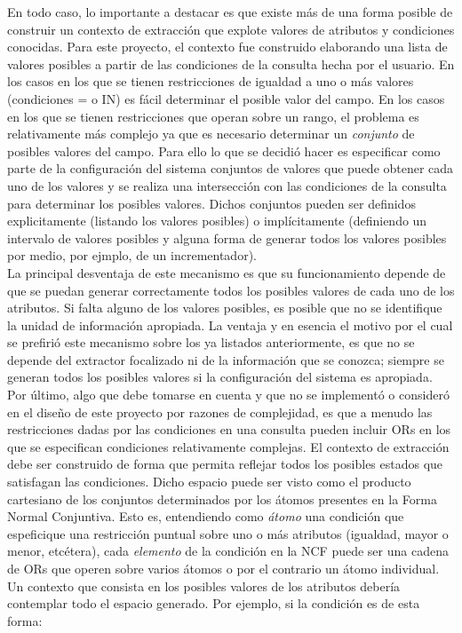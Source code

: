 En todo caso, lo importante a destacar es que existe más de una forma posible de construir un contexto de extracción que explote valores de atributos y condiciones conocidas. Para este proyecto, el contexto fue construido elaborando una lista de valores posibles a partir de las condiciones de la consulta hecha por el usuario. En los casos en los que se tienen restricciones de igualdad a uno o más valores (condiciones = o IN) es fácil determinar el posible valor del campo. En los casos en los que se tienen restricciones que operan sobre un rango, el problema es relativamente más complejo ya que es necesario determinar un \emph{conjunto} de posibles valores del campo. Para ello lo que se decidió hacer es especificar como parte de la configuración del sistema conjuntos de valores que puede obtener cada uno de los valores y se realiza una intersección con las condiciones de la consulta para determinar los posibles valores. Dichos conjuntos pueden ser definidos explicitamente (listando los valores posibles) o implícitamente (definiendo un intervalo de valores posibles y alguna forma de generar todos los valores posibles por medio, por ejmplo, de un incrementador). \\

La principal desventaja de este mecanismo es que su funcionamiento depende de que se puedan generar correctamente todos los posibles valores de cada uno de los atributos. Si falta alguno de los valores posibles, es posible que no se identifique la unidad de información apropiada. La ventaja y en esencia el motivo por el cual se prefirió este mecanismo sobre los ya listados anteriormente, es que no se depende del extractor focalizado ni de la información que se conozca; siempre se generan todos los posibles valores si la configuración del sistema es apropiada. \\

Por último, algo que debe tomarse en cuenta y que no se implementó o consideró en el diseño de este proyecto por razones de complejidad, es que a menudo las restricciones dadas por las condiciones en una consulta pueden incluir ORs en los que se especifican condiciones relativamente complejas. El contexto de extracción debe ser construido de forma que permita reflejar todos los posibles estados que satisfagan las condiciones. Dicho espacio puede ser visto como el producto cartesiano de los conjuntos determinados por los átomos presentes en la Forma Normal Conjuntiva. Esto es, entendiendo como \emph{átomo} una condición que espeficique una restricción puntual sobre uno o más atributos (igualdad, mayor o menor, etcétera), cada \emph{elemento} de la condición en la NCF puede ser una cadena de ORs que operen sobre varios átomos o por el contrario un átomo individual. Un contexto que consista en los posibles valores de los atributos debería contemplar todo el espacio generado. Por ejemplo, si la condición es de esta forma: \\

